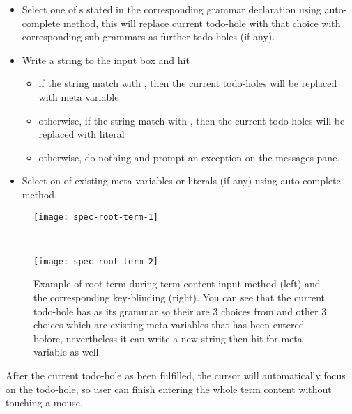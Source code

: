 \documentclass[master.tex]{subfiles}
\begin{document}
\begin{itemize}
\item Select one of \kChoice{}s stated in the corresponding grammar declaration
  using auto-complete method,
  this will replace current todo-hole with that choice with corresponding
  sub-grammars as further todo-holes (if any).
\item Write a string to the input box and hit 
  \begin{itemize}
  \item if the string match with \kMetaVarRegex, then the current todo-holes
    will be replaced with meta variable
  \item otherwise, if the string match with \kLiteralRegex, then the current
    todo-holes will be replaced with literal
  \item otherwise, do nothing and prompt an exception on the messages pane.
  \end{itemize}
\item Select on of existing meta variables or literals (if any) using
  auto-complete method.
\end{itemize}

\begin{figure}[H]
    \centering

\begin{minipage}{0.50\textwidth}
\begin{flushleft}
    \texttt{[image: spec-root-term-1]}
\end{flushleft}
\end{minipage}
~
\begin{minipage}{0.35\textwidth}
\begin{flushright}
    \texttt{[image: spec-root-term-2]}
\end{flushright}
\end{minipage}
\caption{Example of root term during term-content input-method (left) and the
  corresponding key-blinding (right). You can see that the current todo-hole has
   as its grammar so their are 3 choices from  and other 3
  choices which are existing meta variables that has been entered bofore,
  nevertheless it can write a new string then hit  for meta
  variable as well.}
\label{spec-root-term-todo}
\end{figure}

After the current todo-hole as been fulfilled, the cursor will automatically
focus on the todo-hole, so user can finish entering the whole term content
without touching a mouse.
\end{document}
